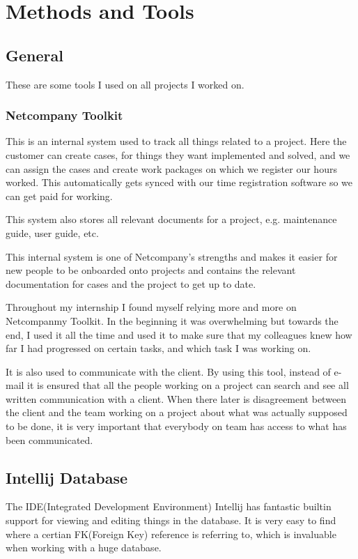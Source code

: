 \documentclass[../main.tex]{subfiles}
\begin{document}
\section{Methods and Tools}
\label{sec:methods}
\subsection{General}
These are some tools I used on all projects I worked on.
\subsubsection{Netcompany Toolkit}
This is an internal system used to track all things related to a project. Here the customer can create cases, for things they want implemented and solved, and we can assign the cases and create work packages on which we register our hours worked. This automatically gets synced with our time registration software so we can get paid for working. 

This system also stores all relevant documents for a project, e.g. maintenance guide, user guide, etc.

This internal system is one of Netcompany's strengths and makes it easier for new people to be onboarded onto projects and contains the relevant documentation for cases and the project to get up to date.

Throughout my internship I found myself relying more and more on Netcompanmy Toolkit. In the beginning it was overwhelming but towards the end, I used it all the time and used it to make sure that my colleagues knew how far I had progressed on certain tasks, and which task I was working on.

It is also used to communicate with the client. By using this tool, instead of e-mail it is ensured that all the people working on a project can search and see all written communication with a client. When there later is disagreement between the client and the team working on a project about what was actually supposed to be done, it is very important that everybody on team has access to what has been communicated. 
\subsection{Intellij Database}
The IDE(Integrated Development Environment) Intellij has fantastic builtin support for viewing and editing things in the database. It is very easy to find where a certian FK(Foreign Key) reference is referring to, which is invaluable when working with a huge database. 
\end{document}
